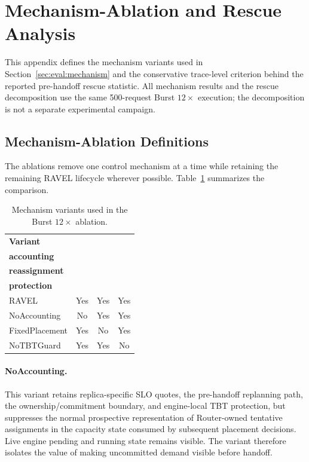 \section{Mechanism-Ablation and Rescue Analysis}
\label{app:mechanism-analysis}

This appendix defines the mechanism variants used in
Section~\ref{sec:eval:mechanism} and the conservative trace-level criterion
behind the reported pre-handoff rescue statistic.
All mechanism results and the rescue decomposition use the same 500-request
Burst $12\times$ execution; the decomposition is not a separate experimental
campaign.


\subsection{Mechanism-Ablation Definitions}
\label{sec:appendix:mechanism-ablations}

The ablations remove one control mechanism at a time while retaining the
remaining RAVEL lifecycle wherever possible.
Table~\ref{tab:appendix:mechanism-ablations} summarizes the comparison.

\begin{table}[t]
    \centering
    \small
    \caption{Mechanism variants used in the Burst $12\times$ ablation.}
    \label{tab:appendix:mechanism-ablations}
    \setlength{\tabcolsep}{3.5pt}
    \renewcommand{\arraystretch}{1.10}
    \begin{tabular}{@{}lccc@{}}
        \toprule
        \textbf{Variant} &
        \makecell{\textbf{Prospective}\\\textbf{accounting}} &
        \makecell{\textbf{Pre-handoff}\\\textbf{reassignment}} &
        \makecell{\textbf{Local TBT}\\\textbf{protection}} \\
        \midrule
        RAVEL          & Yes & Yes & Yes \\
        NoAccounting   & No  & Yes & Yes \\
        FixedPlacement & Yes & No  & Yes \\
        NoTBTGuard     & Yes & Yes & No  \\
        \bottomrule
    \end{tabular}
\end{table}

\paragraph{NoAccounting.}
This variant retains replica-specific SLO quotes, the pre-handoff replanning
path, the ownership/commitment boundary, and engine-local TBT protection, but
suppresses the normal prospective representation of Router-owned tentative
assignments in the capacity state consumed by subsequent placement decisions.
Live engine pending and running state remains visible.
The variant therefore isolates the value of making uncommitted demand visible
before handoff.

